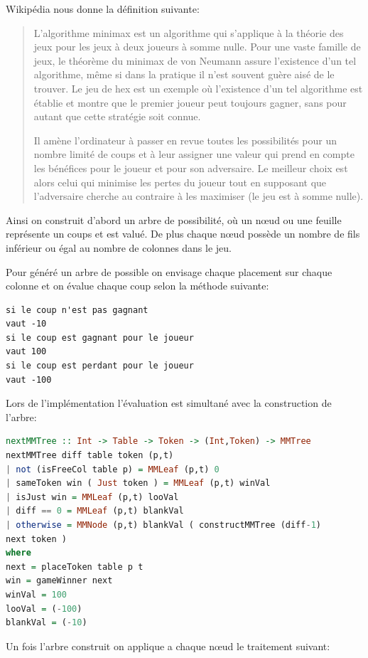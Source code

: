 \documentclass[a4paper]{article}
\begin{document}
Wikipédia nous donne la définition suivante:
\begin{quote}
L'algorithme minimax est un algorithme qui s'applique à la théorie des jeux pour les jeux à deux joueurs à somme nulle. Pour une vaste famille de jeux, le théorème du minimax de von Neumann assure l'existence d'un tel algorithme, même si dans la pratique il n'est souvent guère aisé de le trouver. Le jeu de hex est un exemple où l'existence d'un tel algorithme est établie et montre que le premier joueur peut toujours gagner, sans pour autant que cette stratégie soit connue.

Il amène l'ordinateur à passer en revue toutes les possibilités pour un nombre limité de coups et à leur assigner une valeur qui prend en compte les bénéfices pour le joueur et pour son adversaire. Le meilleur choix est alors celui qui minimise les pertes du joueur tout en supposant que l'adversaire cherche au contraire à les maximiser (le jeu est à somme nulle).
\end{quote}

Ainsi on construit d'abord un arbre de possibilité, où un n\oe ud ou une feuille représente un coups et est valué. De plus chaque n\oe ud possède un nombre de fils inférieur ou égal au nombre de colonnes dans le jeu.

Pour généré un arbre de possible on envisage chaque placement sur chaque colonne et on évalue chaque coup selon la méthode suivante:

\begin{lstlisting}
si le coup n'est pas gagnant
vaut -10
si le coup est gagnant pour le joueur
vaut 100
si le coup est perdant pour le joueur
vaut -100
\end{lstlisting}

Lors de l'implémentation l'évaluation est simultané avec la construction de l'arbre:

\begin{lstlisting}[language=haskell]
nextMMTree :: Int -> Table -> Token -> (Int,Token) -> MMTree
nextMMTree diff table token (p,t)
| not (isFreeCol table p) = MMLeaf (p,t) 0
| sameToken win ( Just token ) = MMLeaf (p,t) winVal
| isJust win = MMLeaf (p,t) looVal
| diff == 0 = MMLeaf (p,t) blankVal
| otherwise = MMNode (p,t) blankVal ( constructMMTree (diff-1)
next token )
where
next = placeToken table p t
win = gameWinner next
winVal = 100
looVal = (-100)
blankVal = (-10)
\end{lstlisting}

Un fois l'arbre construit on applique a chaque n\oe ud le traitement suivant:
\end{document}
